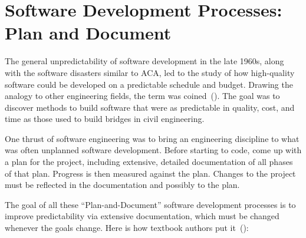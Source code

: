 \section{Software Development Processes: Plan and Document}
\label{sec:waterfall}


The general unpredictability of software development in the late 1960s,
along with the software disasters similar to ACA, led to the study of
how high-quality software could be developed on a predictable schedule
and budget. Drawing the analogy to other engineering fields, the term
 was coined~(\cite{Naur69}). The goal was to
discover methods to build software that were as predictable in quality,
cost, and time as those used to build bridges in civil engineering.

One thrust of software engineering was to bring an engineering discipline to what was often unplanned software development. Before starting to code, come up with a plan for the project, including extensive, detailed documentation of all phases of that plan. Progress is then measured against the plan. Changes to the project must be reflected in the documentation and possibly to the plan.

The goal of all these ``Plan-and-Document'' software development processes
is to improve predictability via extensive documentation,
which must be changed whenever the goals change. Here is how textbook
authors put it~(\cite{Lethbridge02,Braude01}):


